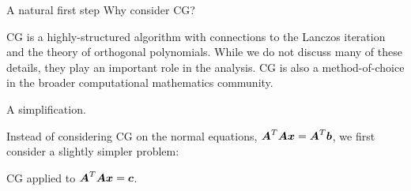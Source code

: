 \documentclass[9pt,aspectratio=169]{beamer}
\begin{document}
\begin{frame}{A natural first step}
    Why consider CG?
    
    \vspace{.1in}\pause
    CG is a highly-structured algorithm with connections to the Lanczos iteration and the theory of orthogonal polynomials.  While we do not discuss many of these details, they play an important role in the analysis.  CG is also a method-of-choice in the broader computational mathematics community.
    
    \pause \vspace{.1in}
    A simplification.
    
    \vspace{.1in}\pause
    Instead of considering CG on the normal equations,  ${\boldsymbol A}^T {\boldsymbol A} {\boldsymbol x} = {\boldsymbol A}^T {\boldsymbol b}$, we first consider a slightly simpler problem:
    \begin{center}
        CG applied to ${\boldsymbol A}^T {\boldsymbol A} {\boldsymbol x} = {\boldsymbol c}$.
    \end{center}
\end{frame}



  

\end{document}

